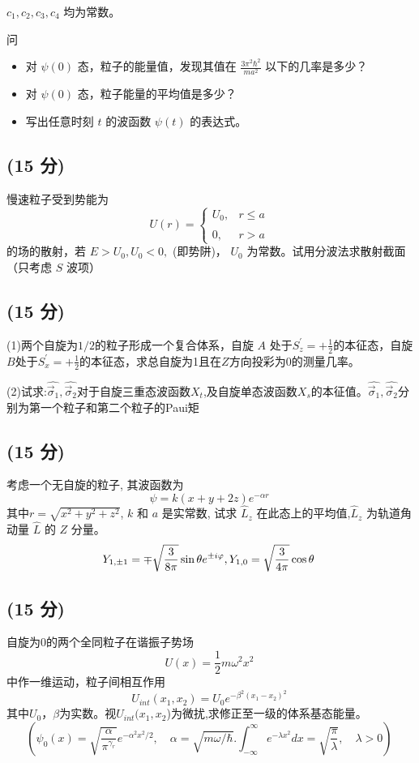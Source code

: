 \(c_1, c_2, c_3, c_4\) 均为常数。

问\begin{itemize}
  \item  对 \( \psi (0) \) 态，粒子的能量值，发现其值在 \( \frac{3\pi^2 \hbar^2}{ma^2} \) 以下的几率是多少？
  \item  对 \( \psi (0) \) 态，粒子能量的平均值是多少？
  \item  写出任意时刻 \( t \) 的波函数 \( \psi (t) \) 的表达式。
\end{itemize}
\subsection{(15 分)}
 慢速粒子受到势能为
\[U(r) = \begin{cases} U_0, & r \leq a \\\\0, & r > a \end{cases}~\]
的场的散射，若 $E > U_0, U_0 < 0,$ (即势阱)， $U_0$ 为常数。试用分波法求散射截面（只考虑 $S$ 波项）
\subsection{(15 分)}
(1)两个自旋为$1/2$的粒子形成一个复合体系，自旋 $A$ 处于$S^\prime_z =+\frac{1}{2}$的本征态，自旋$B$处于$S^\prime_x=+\frac{1}{2}$的本征态，求总自旋为1且在$Z$方向投彩为0的测量几率。

(2)试求:$\hat{\vec{\sigma}_1},\hat{\vec{\sigma}_2}$对于自旋三重态波函数$X_t$,及自旋单态波函数$X_s$的本征值。$\hat{\vec{\sigma}_1},\hat{\vec{\sigma}_2}$分别为第一个粒子和第二个粒子的Paui矩
\subsection{(15 分)}
考虑一个无自旋的粒子, 其波函数为
\[\psi = k (x + y + 2z) e^{-\alpha r}~\]
其中$r = \sqrt{x^2 + y^2 + z^2}$, $ k$ 和 $a$ 是实常数, 试求 $\hat{L}_z$ 在此态上的平均值,$\hat{L}_z$ 为轨道角动量 $\hat{L}$ 的 $Z$ 分量。
\[Y_{1, \pm 1} = \mp \sqrt{\frac{3}{8\pi}} \sin \theta e^{\pm i\varphi}, \\ Y_{1,0} = \sqrt{\frac{3}{4\pi}} \cos \theta~\]
\subsection{(15 分)}
自旋为0的两个全同粒子在谐振子势场
\[U(x)=\frac{1}{2}m\omega^2x^2~\]
中作一维运动，粒子间相互作用
\[U_{int}(x_1,x_2)=U_0e^{-\beta^2(x_1-x_2)^2}~\]
其中$U_0$，$\beta$为实数。视$U_{int}(x_1,x_2$)为微扰,求修正至一级的体系基态能量。
$$\left( \psi_0(x) = \sqrt{\frac{\alpha}{\pi^{ \gamma_r }}} e^{-\alpha^2 x^2 / 2}, \quad \alpha = \sqrt{m\omega/\hbar} . \int_{-\infty}^{\infty} e^{-\lambda x^2} dx = \sqrt{\frac{\pi}{\lambda}},\quad \lambda > 0 \right)~$$